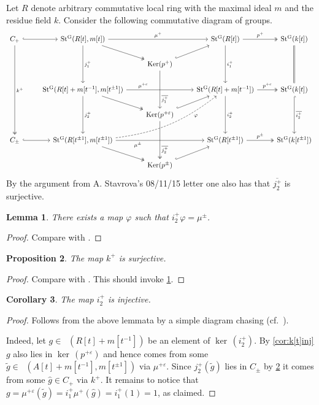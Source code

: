 \documentclass[oneside,12pt]{amsart}
\numberwithin{equation}{section}
\newtheorem{lem}{Lemma}
\numberwithin{lem}{section}
\newtheorem{cor}[lem]{Corollary}
\newtheorem{prop}[lem]{Proposition}
\theoremstyle{definition}
\theoremstyle{remark}
\DeclareMathOperator{\St}{St^G}
\DeclareMathOperator{\Ker}{ker\,}
\begin{document}
Let $R$ denote arbitrary commutative local ring with the maximal ideal $m$ and the residue field $k$.
Consider the following commutative diagram of groups.
\[\begin{tikzcd} 
C_+ \ar[r, hookrightarrow] \ar[dddd, "k^+", twoheadrightarrow] & \St(R[t], m[t]) \ar[rd, twoheadrightarrow] \ar[rr, "\mu^+"] \ar[dd, "j^+_1"] & & \ar[dd, "i^+_1"] \St(R[t]) \ar[r, "p^+", twoheadrightarrow] & \St(k[t]) \ar[dd, equal] \\    
 &  & \mathrm{Ker}(p^+) \ar[ur, hookrightarrow] \ar[dd, "\overline{j^+_1}" near end] & &  \\    
 & \St(R[t] + m[t^{-1}], m[t^{\pm 1}]) \ar[rd, twoheadrightarrow] \ar[rr, "\mu^{+\varepsilon}" near start] \ar[dd, "j^+_2"] & & \ar[dd, "i^+_2"] \St(R[t]+m[t^{-1}]) \ar[r, "p^{+\varepsilon}", twoheadrightarrow] & \St(k[t]) \ar[dd, hookrightarrow, "\overline{i_2^+}"] \\     
 &  & \mathrm{Ker}(p^{+\varepsilon}) \ar[ur, hookrightarrow] \ar[dd, "\overline{j^+_2}" near end, twoheadrightarrow] & &  \\    
C_{\pm} \ar[r, hookrightarrow] & \St(R[t^{\pm 1}], m[t^{\pm 1}]) \ar[uurr, bend right=15, dashrightarrow, "\varphi"' near end] \ar[rd, twoheadrightarrow] \ar[rr, "\mu^\pm"' near start] &  & \St(R[t^{\pm 1}]) \ar[r, "p^\pm", twoheadrightarrow] & \St(k[t^{\pm 1}]) \\
 &  & \mathrm{Ker}(p^\pm) \ar[ur, hookrightarrow] & &  
\end{tikzcd}\]
By the argument from A. Stavrova's 08/11/15 letter one also has that $\overline{j^+_2}$ is surjective.

\begin{lem} \label{lem:TulDiagram} There exists a map $\varphi$ such that $ i_2^+ \varphi = \mu^\pm$. \end{lem}
\begin{proof}
 Compare with \cite[Lemma~3.2]{Tu}.  
\end{proof}

\begin{prop} \label{prop:TulKernSurject} The map $k^+$ is surjective. \end{prop}
\begin{proof}
 Compare with \cite[Proposition~4.1]{Tu}. This should invoke \cref{lem:TulDiagram}. 
\end{proof}

\begin{cor} \label{cor:TulInj} The map $i^+_2$ is injective. \end{cor}
\begin{proof}
 Follows from the above lemmata by a simple diagram chasing (cf.~\cite[Cor.~4.2]{Tu}).
 
 Indeed, let $g \in \St(R[t] + m[t^{-1}])$ be an element of $\Ker(i_2^+)$.
 By \cref{cor:k[t]inj} $g$ also lies in $\Ker(p^{+\varepsilon})$ and hence comes from some $\widetilde{g} \in \St(A[t]+m[t^{-1}], m[t^{\pm 1}])$ via $\mu^{+\varepsilon}$.
 Since $j^+_2(\widetilde{g})$ lies in $C_\pm$ by \cref{prop:TulKernSurject} it comes from some $\widehat{g} \in C_+$ via $k^+$.
 It remains to notice that $g = \mu^{+\varepsilon}(\widetilde{g}) = i_1^+\mu^+(\widehat{g}) = i_1^+(1) = 1$, as claimed. 
\end{proof}
\end{document}
